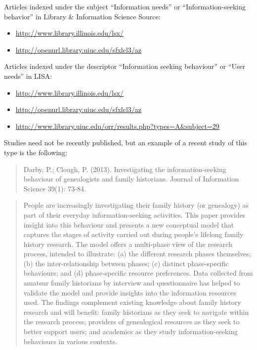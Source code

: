 \documentclass[]{article}
\providecommand{\tightlist}{%
  \setlength{\itemsep}{0pt}\setlength{\parskip}{0pt}}
\begin{document}
Articles indexed under the subject ``Information needs'' or
``Information-seeking behavior'' in Library \& Information Science
Source:

\begin{itemize}
\tightlist
\item
  \url{http://www.library.illinois.edu/lsx/}
\item
  \url{http://openurl.library.uiuc.edu/sfxlcl3/az}
\end{itemize}

Articles indexed under the descriptor ``Information seeking behaviour''
or ``User needs'' in LISA:

\begin{itemize}
\tightlist
\item
  \url{http://www.library.illinois.edu/lsx/}
\item
  \url{http://openurl.library.uiuc.edu/sfxlcl3/az}
\item
  \url{http://www.library.uiuc.edu/orr/results.php?types=A\&subject=29}
\end{itemize}

Studies need not be recently published, but an example of a recent study
of this type is the following:

\begin{quote}
Darby, P.; Clough, P. (2013). Investigating the information-seeking
behaviour of genealogists and family historians. Journal of Information
Science 39(1): 73-84.
\end{quote}

\begin{quote}
People are increasingly investigating their family history (or
genealogy) as part of their everyday information-seeking activities.
This paper provides insight into this behaviour and presents a new
conceptual model that captures the stages of activity carried out during
people's lifelong family history research. The model offers a
multi-phase view of the research process, intended to illustrate: (a)
the different research phases themselves; (b) the inter-relationship
between phases; (c) distinct phase-specific behaviours; and (d)
phase-specific resource preferences. Data collected from amateur family
historians by interview and questionnaire has helped to validate the
model and provide insights into the information resources used. The
findings complement existing knowledge about family history research and
will benefit: family historians as they seek to navigate within the
research process; providers of genealogical resources as they seek to
better support users; and academics as they study information-seeking
behaviours in various contexts.
\end{quote}
\end{document}
